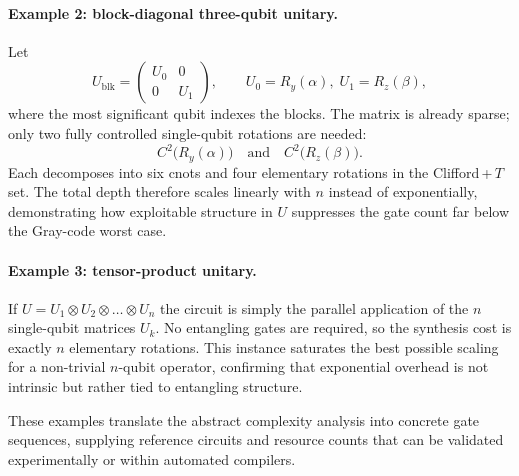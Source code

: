 \paragraph{Example 2: block-diagonal three-qubit unitary.}  
Let  
\[
U_{\mathrm{blk}}=
\begin{pmatrix}
U_{0} & 0 \\ 0 & U_{1}
\end{pmatrix},
\qquad
U_{0}=R_{y}(\alpha),\;
U_{1}=R_{z}(\beta),
\]
where the most significant qubit indexes the blocks. The matrix is already sparse; only two fully controlled single-qubit rotations are needed:
\[
C^{2}\bigl(R_{y}(\alpha)\bigr)\quad\text{and}\quad
C^{2}\bigl(R_{z}(\beta)\bigr).
\]
Each decomposes into six \gls{cnot}s and four elementary rotations in the Clifford\,+\,$T$ set. The total depth therefore scales linearly with $n$ instead of exponentially, demonstrating how exploitable structure in $U$ suppresses the gate count far below the Gray-code worst case.

\paragraph{Example 3: tensor-product unitary.}  
If $U=U_{1}\otimes U_{2}\otimes\dots\otimes U_{n}$ the circuit is simply the parallel application of the $n$ single-qubit matrices $U_{k}$. No entangling gates are required, so the synthesis cost is exactly $n$ elementary rotations. This instance saturates the best possible scaling for a non-trivial $n$-qubit operator, confirming that exponential overhead is not intrinsic but rather tied to entangling structure.

These examples translate the abstract complexity analysis into concrete gate sequences, supplying reference circuits and resource counts that can be validated experimentally or within automated compilers.

